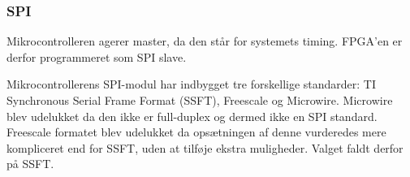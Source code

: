 
\subsubsection{SPI}
\label{sec:spi-implementering}
Mikrocontrolleren agerer master, da den står for systemets timing. FPGA'en er derfor programmeret som SPI slave.

Mikrocontrollerens SPI-modul har indbygget tre forskellige standarder: TI Synchronous Serial Frame Format (SSFT), Freescale og Microwire. 
Microwire blev udelukket da den ikke er full-duplex og dermed ikke en SPI standard. 
Freescale formatet blev udelukket da opsætningen af denne vurderedes mere kompliceret end for SSFT,
uden at tilføje ekstra muligheder.
Valget faldt derfor på SSFT.

